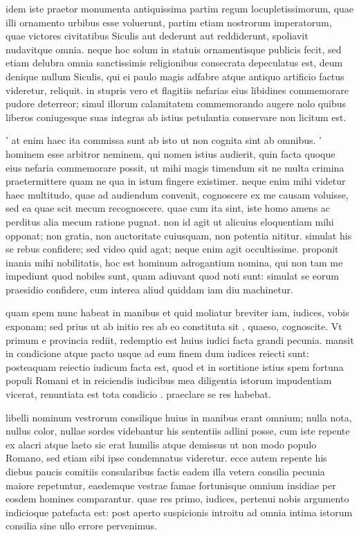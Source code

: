  idem iste praetor monumenta antiquissima partim regum locupletissimorum, quae illi ornamento urbibus esse voluerunt, partim etiam nostrorum imperatorum, quae victores civitatibus Siculis aut dederunt aut reddiderunt, spoliavit nudavitque omnia. neque hoc solum in statuis ornamentisque publicis fecit, sed etiam delubra omnia sanctissimis religionibus consecrata depeculatus est, deum denique nullum Siculis, qui ei paulo magis adfabre atque antiquo artificio factus videretur, reliquit. in stupris vero et flagitiis nefarias eius libidines commemorare pudore deterreor; simul illorum calamitatem commemorando augere nolo quibus liberos coniugesque suas integras ab istius petulantia conservare non licitum est.

 ' at enim haec ita commissa sunt ab isto ut non cognita sint ab omnibus. ' hominem esse arbitror neminem, qui nomen istius audierit, quin facta quoque eius nefaria commemorare possit, ut mihi magis timendum sit ne multa crimina praetermittere quam ne qua in istum fingere existimer. neque enim mihi videtur haec multitudo, quae ad audiendum convenit, cognoscere ex me causam voluisse, sed ea quae scit mecum recognoscere. quae cum ita sint, iste homo amens ac perditus alia mecum ratione pugnat. non id agit ut alicuius eloquentiam mihi opponat; non gratia, non auctoritate cuiusquam, non potentia nititur. simulat his se rebus confidere; sed video quid agat; neque enim agit occultissime. proponit inania mihi nobilitatis, hoc est hominum adrogantium nomina, qui non tam me impediunt quod nobiles sunt, quam adiuvant quod noti sunt: simulat se eorum praesidio confidere, cum interea aliud quiddam iam diu machinetur.

 quam spem nunc habeat in manibus et quid moliatur breviter iam, iudices, vobis exponam; sed prius ut ab initio res ab eo constituta sit , quaeso, cognoscite. Vt primum e provincia rediit, redemptio est huius iudici facta grandi pecunia. mansit in condicione atque pacto usque ad eum finem dum iudices reiecti sunt: posteaquam reiectio iudicum facta est, quod et in sortitione istius spem fortuna populi Romani et in reiciendis iudicibus mea diligentia istorum impudentiam vicerat, renuntiata est tota condicio . praeclare se res habebat.

 libelli nominum vestrorum consilique huius in manibus erant omnium; nulla nota, nullus color, nullae sordes videbantur his sententiis adlini posse, cum iste repente ex alacri atque laeto sic erat humilis atque demissus ut non modo populo Romano, sed etiam sibi ipse condemnatus videretur. ecce autem repente his diebus paucis comitiis consularibus factis eadem illa vetera consilia pecunia maiore repetuntur, eaedemque vestrae famae fortunisque omnium insidiae per eosdem homines comparantur. quae res primo, iudices, pertenui nobis argumento indicioque patefacta est: post aperto suspicionis introitu ad omnia intima istorum consilia sine ullo errore pervenimus.

